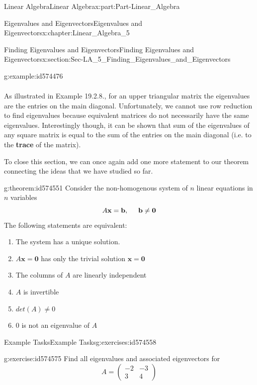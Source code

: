 \documentclass[oneside,10pt,]{book}
\newcommand{\terminology}[1]{\textbf{#1}}
\numberwithin{equation}{section}
\newcommand{\amp}{&}
\begin{document}
\begin{partptx}{Linear Algebra}{}{Linear Algebra}{}{}{x:part:Part-Linear_Algebra}
\begin{chapterptx}{Eigenvalues and Eigenvectors}{}{Eigenvalues and Eigenvectors}{}{}{x:chapter:Linear_Algebra_5}
\begin{sectionptx}{Finding Eigenvalues and Eigenvectors}{}{Finding Eigenvalues and Eigenvectors}{}{}{x:section:Sec-LA_5_Finding_Eigenvalues_and_Eigenvectors}
\begin{example}{}{g:example:id574476}
\begin{align*}
\end{align*}
%
\end{example}
As illustrated in Example 19.2.8., for an upper triangular matrix the eigenvalues are the entries on the main diagonal. Unfortunately, we cannot use row reduction to find eigenvalues because equivalent matrices do not necessarily have the same eigenvalues. Interestingly though, it can be shown that sum of the eigenvalues of any square matrix is equal to the sum of the entries on the main diagonal (i.e. to the \terminology{trace} of the matrix).%
\par
To close this section, we can once again add one more statement to our theorem connecting the ideas that we have studied so far.%
\begin{theorem}{}{}{g:theorem:id574551}%
Consider the non-homogenous system of \(n\) linear equations in \(n\) variables%
\begin{equation*}
A\mathbf{x}=\mathbf{b}, \hspace{5mm} \mathbf{b\neq 0}
\end{equation*}
The following statements are equivalent:%
\begin{enumerate}[label=\arabic*.]
\item{}The system has a unique solution.%
\item{}\(A\mathbf{x}=\mathbf{0}\) has only the trivial solution \(\mathbf{x}=\mathbf{0}\)%
\item{}The columns of \(A\) are linearly independent%
\item{}\(A\) is invertible%
\item{}\(\displaystyle det(A)\neq 0\)%
\item{}\(0\) is not an eigenvalue of \(A\)%
\end{enumerate}
%
\end{theorem}
%
%
\typeout{************************************************}
\typeout{************************************************}
%
\begin{exercises-subsection-numberless}{Example Tasks}{}{Example Tasks}{}{}{g:exercises:id574558}
\begin{divisionexercise}{1}{}{}{g:exercise:id574575}%
Find all eigenvalues and associated eigenvectors for%
\begin{equation*}
A=\begin{pmatrix} -2 \amp -3 \\ 3 \amp 4 \end{pmatrix}
\end{equation*}

\end{divisionexercise}
\end{exercises-subsection-numberless}
\end{sectionptx}
\end{chapterptx}
\end{partptx}
\end{document}
